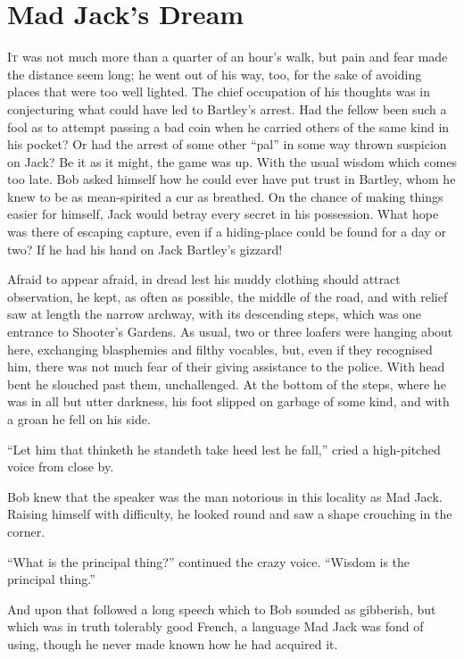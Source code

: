 \chapter{Mad Jack's Dream}

\textsc{It} was not much more than a quarter of an hour's walk, but pain
and fear made the distance seem long; he went out of his way, too, for
the sake of avoiding places that were too well lighted. The chief
occupation of his thoughts was in conjecturing what could have led to
Bartley's arrest. Had the fellow been such a fool as to attempt passing
a bad coin when he carried others of the same kind in his pocket? Or had
the arrest of some other ``pal'' in some way thrown suspicion on Jack?
Be it as it might, the game was up. With the usual wisdom which comes
too late. Bob asked himself how he could ever have put trust in Bartley,
whom he knew to be as mean-spirited a cur as breathed. On the chance of
making things easier for himself, Jack would betray every secret in his
possession. What hope {\protect\hypertarget{194}{}{}}was there of
escaping capture, even if a hiding-place could be found for a day or
two? If he had his hand on Jack Bartley's gizzard!

Afraid to appear afraid, in dread lest his muddy clothing should attract
observation, he kept, as often as possible, the middle of the road, and
with relief saw at length the narrow archway, with its descending steps,
which was one entrance to Shooter's Gardens. As usual, two or three
loafers were hanging about here, exchanging blasphemies and filthy
vocables, but, even if they recognised him, there was not much fear of
their giving assistance to the police. With head bent he slouched past
them, unchallenged. At the bottom of the steps, where he was in all but
utter darkness, his foot slipped on garbage of some kind, and with a
groan he fell on his side.

``Let him that thinketh he standeth take heed lest he fall,'' cried a
high-pitched voice from close by.

Bob knew that the speaker was the man notorious in this locality as Mad
Jack. Raising himself with difficulty, he looked round and saw a shape
crouching in the corner.

``What is the principal thing?'' continued
{\protect\hypertarget{195}{}{}}the crazy voice. ``Wisdom is the
principal thing.''

And upon that followed a long speech which to Bob sounded as gibberish,
but which was in truth tolerably good French, a language Mad Jack was
fond of using, though he never made known how he had acquired it.

